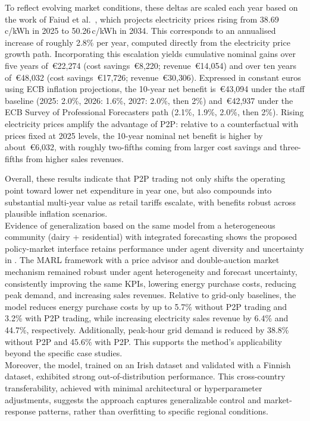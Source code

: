 \documentclass[preprint,12pt]{elsarticle}
\begin{document}
To reflect evolving market conditions, these deltas are scaled each year based on the work of Faiud et al.~\cite{faiud2024evaluating}, which projects electricity prices rising from 38.69\,c/kWh in 2025 to 50.26\,c/kWh in 2034. This corresponds to an annualised increase of roughly 2.8\% per year, computed directly from the electricity price growth path. Incorporating this escalation yields cumulative nominal gains over five years of~\euro22{,}274 (cost savings~\euro8{,}220; revenue~\euro14{,}054) and over ten years of~\euro48{,}032 (cost savings~\euro17{,}726; revenue~\euro30{,}306). Expressed in constant euros using ECB inflation projections, the 10-year net benefit is~\euro43{,}094 under the staff baseline (2025: 2.0\%, 2026: 1.6\%, 2027: 2.0\%, then 2\%) and~\euro42{,}937 under the ECB Survey of Professional Forecasters path (2.1\%, 1.9\%, 2.0\%, then 2\%). Rising electricity prices amplify the advantage of P2P: relative to a counterfactual with prices fixed at 2025 levels, the 10-year nominal net benefit is higher by about~\euro6{,}032, with roughly two-fifths coming from larger cost savings and three-fifths from higher sales revenues.

Overall, these results indicate that P2P trading not only shifts the operating point toward lower net expenditure in year one, but also compounds into substantial multi-year value as retail tariffs escalate, with benefits robust across plausible inflation scenarios.\\

Evidence of generalization based on the same model from a heterogeneous community (dairy + residential) with integrated forecasting shows the proposed policy-market interface retains performance under agent diversity and uncertainty in \cite{shah2025uncertainty}. The MARL framework with a price advisor and double-auction market mechanism remained robust under agent heterogeneity and forecast uncertainty, consistently improving the same KPIs, lowering energy purchase costs, reducing peak demand, and increasing sales revenues. Relative to grid-only baselines, the model reduces energy purchase costs by up to 5.7\% without P2P trading and 3.2\% with P2P trading, while increasing electricity sales revenue by 6.4\% and 44.7\%, respectively. Additionally, peak-hour grid demand is reduced by 38.8\% without P2P and 45.6\% with P2P. This supports the method’s applicability beyond the specific case studies.\\
Moreover, the model, trained on an Irish dataset and validated with a Finnish dataset, exhibited strong out-of-distribution performance. This cross-country transferability, achieved with minimal architectural or hyperparameter adjustments, suggests the approach captures generalizable control and market-response patterns, rather than overfitting to specific regional conditions.
\end{document}
